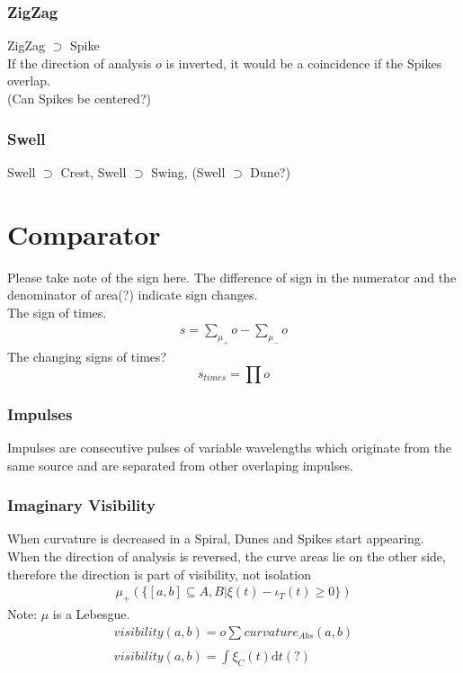 \documentclass{report}
\begin{document}
\subsection{ZigZag}
ZigZag $\supset$ Spike\\
If the direction of analysis $o$ is inverted, it would be a coincidence if the Spikes overlap.\\
(Can Spikes be centered?)
\subsection{Swell}
Swell $\supset$ Crest, Swell $\supset$ Swing, (Swell $\supset$ Dune?)

\chapter{Comparator}
Please take note of the sign here. The difference of sign in the numerator and the denominator of area(?) indicate sign changes.\\
The sign of times.
\begin{align}
s = \sum_{\mu_{+}}^{}o -  \sum_{\mu_{-}}^{}o
\end{align}
The changing signs of times?
\begin{equation}
s_{times} = \prod o
\end{equation}

\subsection{Impulses}
Impulses are consecutive pulses of variable wavelengths which originate from the same source and are separated from other overlaping impulses.

\subsection{Imaginary Visibility}
When curvature is decreased in a Spiral, Dunes and Spikes start appearing.\\
When the direction of analysis is reversed, the curve areas lie on the other side, therefore the direction is part of visibility, not isolation
\begin{align}
\mu_{+}(\{[a,b] \subseteq A,B \vert \xi(t) -\iota_{T}(t)\geq0\})
\end{align}
Note: $\mu$ is a Lebesgue.
\begin{align}
visibility(a,b)=o \sum_{}^{} curvature_{Abs}(a,b)\\
visibility(a,b)= \int \limits _{}^{}\xi_{C}(t)\mathrm{d}t(?)
\end{align}
\end{document}
